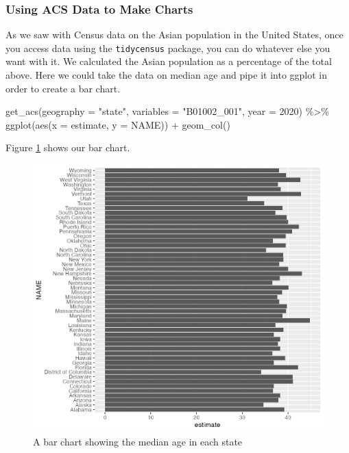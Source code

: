 \documentclass[
]{book}
\newenvironment{Shaded}{\begin{snugshade}}{\end{snugshade}}
\newcommand{\AttributeTok}[1]{\textcolor[rgb]{0.77,0.63,0.00}{#1}}
\newcommand{\DecValTok}[1]{\textcolor[rgb]{0.00,0.00,0.81}{#1}}
\newcommand{\FunctionTok}[1]{\textcolor[rgb]{0.00,0.00,0.00}{#1}}
\newcommand{\NormalTok}[1]{#1}
\newcommand{\SpecialCharTok}[1]{\textcolor[rgb]{0.00,0.00,0.00}{#1}}
\newcommand{\StringTok}[1]{\textcolor[rgb]{0.31,0.60,0.02}{#1}}
\begin{document}
\hypertarget{using-acs-data-to-make-charts}{%
\subsubsection*{Using ACS Data to Make Charts}\label{using-acs-data-to-make-charts}}

As we saw with Census data on the Asian population in the United States, once you access data using the \texttt{tidycensus} package, you can do whatever else you want with it. We calculated the Asian population as a percentage of the total above. Here we could take the data on median age and pipe it into ggplot in order to create a bar chart.

\begin{Shaded}
\begin{Highlighting}[]
\FunctionTok{get\_acs}\NormalTok{(}\AttributeTok{geography =} \StringTok{"state"}\NormalTok{,}
        \AttributeTok{variables =} \StringTok{"B01002\_001"}\NormalTok{,}
        \AttributeTok{year =} \DecValTok{2020}\NormalTok{) }\SpecialCharTok{\%\textgreater{}\%} 
  \FunctionTok{ggplot}\NormalTok{(}\FunctionTok{aes}\NormalTok{(}\AttributeTok{x =}\NormalTok{ estimate,}
             \AttributeTok{y =}\NormalTok{ NAME)) }\SpecialCharTok{+}
  \FunctionTok{geom\_col}\NormalTok{()}
\end{Highlighting}
\end{Shaded}

Figure \ref{fig:median-age-chart} shows our bar chart.

\begin{figure}
\includegraphics[width=1\linewidth]{accessing-data_files/figure-latex/median-age-chart-1} \caption{A bar chart showing the median age in each state}\label{fig:median-age-chart}
\end{figure}
\end{document}
